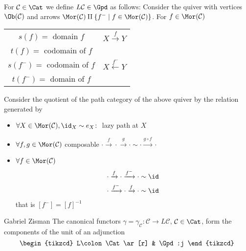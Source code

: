 For $\mathcal{C} \in \Cat$ we define $L\mathcal{C} \in \Gpd$ as follows:
Consider the quiver with vertices $\Ob(\mathcal{C})$ and arrows $\Mor(\mathcal{C}) \amalg \{ f^{-} \mid f \in \Mor(\mathcal{C}) \}$.
For $f \in \Mor(\mathcal{C})$
\begin{center}
\begin{tabular}{cc}
    $s(f)=$ domain $f$ & $X \xrightarrow{f} Y$  
    \\
    $t(f)=$ codomain of $f$ &
    \\
    $s(f^{-})=$ codomain of $f$ & $X \xleftarrow{f^{-}}Y$
    \\
    $t(f^{-})=$ domain of $f$
\end{tabular}
\end{center}

Consider the quotient of the path category of the above quiver by the relation generated by 
\begin{itemize}
    \item 
    $\forall X \in \Mor(\mathcal{C}), \id_X \sim e_X\colon $ lazy path at $X$
    \item 
    $\forall f,g \in \Mor(\mathcal{C})$ composable $\cdot \xrightarrow{f} \cdot \xrightarrow{g} \cdot \sim \cdot \xrightarrow{g \circ f} \cdot$
    \item 
    $\forall f \in \Mor(\mathcal{C})$
    \begin{align*}
        \cdot \xrightarrow{f} \cdot \xrightarrow{f^-} \cdot \sim \id
        \\
        \cdot \xrightarrow{f^-} \cdot \xrightarrow{f} \cdot \sim \id
    \end{align*}
    that is $[f^-]=[f]^{-1}$
\end{itemize}

\begin{thm}{Gabriel Zisman}
    The canonical functors $\gamma = \gamma_{\mathcal{C}}\colon \mathcal{C} \to L \mathcal{C}$, $\mathcal{C} \in \Cat$, form the components of the unit of an adjunction
    \[
    \begin{tikzcd}
        L\colon \Cat
        \ar[r]
        &
        \Gpd:j
    \end{tikzcd}
    \]
\end{thm}

